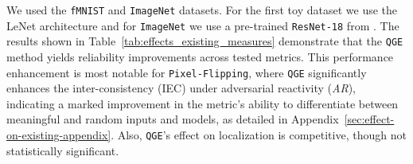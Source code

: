 
We used the \texttt{fMNIST} \cite{fashionmnist2015} and \texttt{ImageNet} \cite{ILSVRC15} datasets. For the first toy dataset we use the LeNet architecture \cite{lecun2010mnist} and for \texttt{ImageNet} we use a pre-trained \texttt{ResNet-18} \cite{he2015deep} from \cite{Pytorch2019}. The results shown in Table~\ref{tab:effects_existing_measures} demonstrate that the \texttt{QGE} method yields reliability improvements across tested metrics. This performance enhancement is most notable for \texttt{Pixel-Flipping}, where \texttt{QGE} significantly enhances the inter-consistency (IEC) under adversarial reactivity (\textit{AR}), indicating a marked improvement in the metric's ability to differentiate between meaningful and random inputs and models, as detailed in Appendix~\ref{sec:effect-on-existing-appendix}. Also, \texttt{QGE}'s effect on localization is competitive, though not statistically significant.

